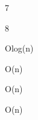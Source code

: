 \begin{problem}{1.1}
\end{problem}
\begin{solution}
7
\end{solution}

\begin{problem}{1.2}
\end{problem}
\begin{solution}
8
\end{solution}

\begin{problem}{1.3}
\end{problem}
\begin{solution}
Olog(n)
\end{solution}

\begin{problem}{1.4}
\end{problem}
\begin{solution}
O(n)
\end{solution}

\begin{problem}{1.5}
\end{problem}
\begin{solution}
O(n)
\end{solution}

\begin{problem}{1.6}
\end{problem}
\begin{solution}
O(n)
\end{solution}

\begin{problem}{2.1}
\end{problem}
\begin{solution}
\end{solution}

\begin{problem}{2.2}
\end{problem}
\begin{solution}
\end{solution}

\begin{problem}{2.3}
\end{problem}
\begin{solution}
\end{solution}

\begin{problem}{2.4}
\end{problem}
\begin{solution}
\end{solution}

